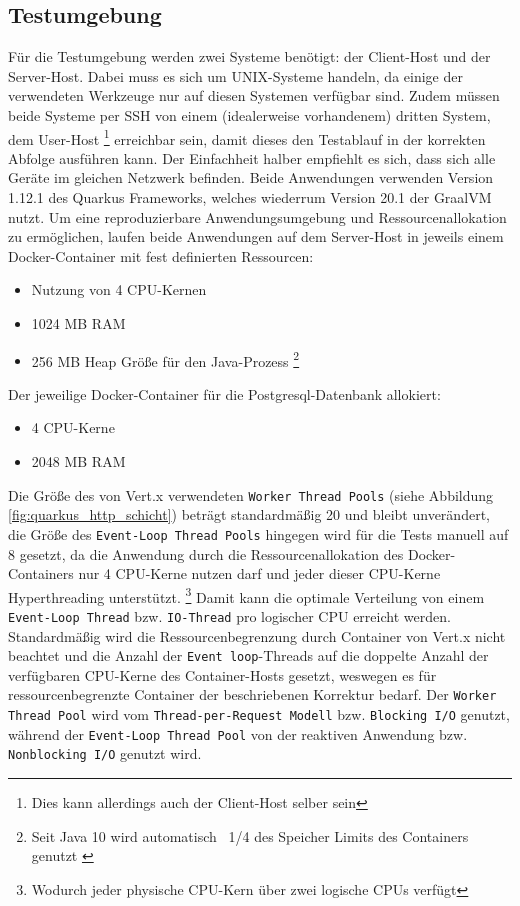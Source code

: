 \subsection{Testumgebung}
\label{section:testumgebung}
Für die Testumgebung werden zwei Systeme benötigt: der Client-Host und der Server-Host.
Dabei muss es sich um UNIX-Systeme handeln, da einige der verwendeten Werkzeuge nur auf diesen Systemen verfügbar sind.
Zudem müssen beide Systeme per SSH von einem (idealerweise vorhandenem) dritten System, dem User-Host
\footnote{Dies kann allerdings auch der Client-Host selber sein}
erreichbar sein, damit dieses den Testablauf in der korrekten Abfolge ausführen kann.
Der Einfachheit halber empfiehlt es sich, dass sich alle Geräte im gleichen Netzwerk befinden.
Beide Anwendungen verwenden Version 1.12.1 des Quarkus Frameworks, welches wiederrum Version 20.1 der GraalVM nutzt.
Um eine reproduzierbare Anwendungsumgebung und Ressourcenallokation zu ermöglichen, laufen beide Anwendungen auf dem Server-Host in
jeweils einem Docker-Container mit fest definierten Ressourcen:
\begin{itemize}
    \item Nutzung von 4 CPU-Kernen
    \item 1024 MB RAM
    \item 256 MB Heap Größe für den Java-Prozess
          \footnote{Seit Java 10 wird automatisch ~1/4 des Speicher Limits des Containers genutzt \parencite{Java10ReleaseNotes}}
\end{itemize}
Der jeweilige Docker-Container für die Postgresql-Datenbank allokiert:
\begin{itemize}
    \item 4 CPU-Kerne
    \item 2048 MB RAM
\end{itemize}

Die Größe des von Vert.x verwendeten \verb|Worker Thread Pools| (siehe Abbildung \ref{fig:quarkus_http_schicht}) beträgt standardmäßig 20 und bleibt
unverändert, die Größe des \verb|Event-Loop Thread Pools| hingegen wird für die Tests manuell auf 8 gesetzt, da die Anwendung durch die Ressourcenallokation
des Docker-Containers nur 4 CPU-Kerne nutzen darf und jeder dieser CPU-Kerne Hyperthreading unterstützt. \footnote{Wodurch jeder physische CPU-Kern über
    zwei logische CPUs verfügt} Damit kann die optimale Verteilung von einem \verb|Event-Loop Thread| bzw. \verb|IO-Thread| pro
logischer CPU erreicht werden.
Standardmäßig wird die Ressourcenbegrenzung durch Container von Vert.x nicht beachtet und die Anzahl der \verb|Event loop|-Threads auf die doppelte
Anzahl der verfügbaren CPU-Kerne des Container-Hosts gesetzt, weswegen es für ressourcenbegrenzte Container der beschriebenen Korrektur bedarf.
Der \verb|Worker Thread Pool| wird vom \verb|Thread-per-Request Modell| bzw. \verb|Blocking I/O| genutzt, während der \verb|Event-Loop Thread Pool| von der
reaktiven Anwendung bzw. \verb|Nonblocking I/O| genutzt wird.

